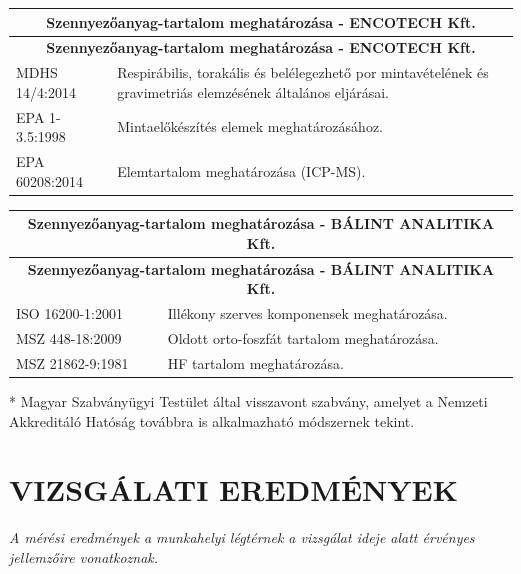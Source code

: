 \documentclass[a4paper,12pt]{article}
\begin{document}
		\begin{longtable}{|p{5cm}|p{10cm}|}
			\hline
			\multicolumn{2}{|c|}{\textbf{Szennyezőanyag-tartalom meghatározása - ENCOTECH Kft.}} \\
			\hline
			\endfirsthead

			\hline
			\multicolumn{2}{|c|}{\textbf{Szennyezőanyag-tartalom meghatározása - ENCOTECH Kft.}} \\
			\hline
			\endhead

			\endfoot

			\hline
			\endlastfoot

			MDHS 14/4:2014 & Respirábilis, torakális és belélegezhető por mintavételének és gravimetriás elemzésének általános eljárásai. \\ \hline EPA 1-3.5:1998 & Mintaelőkészítés elemek meghatározásához. \\ \hline EPA 60208:2014 & Elemtartalom meghatározása (ICP-MS). \\ \hline 

		\end{longtable}

		\begin{longtable}{|p{5cm}|p{10cm}|}
			\hline
			\multicolumn{2}{|c|}{\textbf{Szennyezőanyag-tartalom meghatározása - BÁLINT ANALITIKA Kft.}} \\
			\hline
			\endfirsthead

			\hline
			\multicolumn{2}{|c|}{\textbf{Szennyezőanyag-tartalom meghatározása - BÁLINT ANALITIKA Kft.}} \\
			\hline
			\endhead

			\endfoot

			\hline
			\endlastfoot

			ISO 16200-1:2001 & Illékony szerves komponensek meghatározása. \\ \hline MSZ 448-18:2009 & Oldott orto-foszfát tartalom meghatározása. \\ \hline MSZ 21862-9:1981 & HF tartalom meghatározása. \\ \hline 

		\end{longtable}


		\parbox{\textwidth}{\raggedright \footnotesize
			* Magyar Szabványügyi Testület által visszavont szabvány, amelyet a Nemzeti Akkreditáló Hatóság továbbra is alkalmazható módszernek tekint.
		}


	\newpage
	\section{VIZSGÁLATI EREDMÉNYEK}
		\begin{adjustwidth}{1cm}{0cm}
			\textit{A mérési eredmények a munkahelyi légtérnek a vizsgálat ideje alatt érvényes jellemzőire vonatkoznak.}
		\end{adjustwidth}
\end{document}
